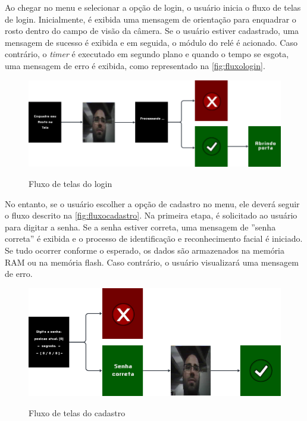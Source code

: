 Ao chegar no menu e selecionar a opção de login, o usuário inicia o 
fluxo de telas de login. Inicialmente, é exibida uma mensagem de 
orientação para enquadrar o rosto dentro do campo de visão da câmera. 
Se o usuário estiver cadastrado, uma mensagem de sucesso é exibida 
e em seguida, o módulo do relé é acionado. Caso contrário, o \textit{timer} 
é executado em segundo plano e quando o tempo se esgota, uma mensagem 
de erro é exibida, como representado na \autoref{fig:fluxologin}.

\begin{figure}[h!]
    \centering
    \caption{Fluxo de telas do login}
    \includegraphics[scale=2.1]{figuras/fluxo_login.png}
    \fonte{}%
    \label{fig:fluxologin}
    \centering
\end{figure}

No entanto, se o usuário escolher a opção de cadastro no menu, 
ele deverá seguir o fluxo descrito na \autoref{fig:fluxocadastro}. 
Na primeira etapa, é solicitado ao usuário para digitar a senha. 
Se a senha estiver correta, uma mensagem de ''senha correta'' é 
exibida e o processo de identificação e reconhecimento facial 
é iniciado. Se tudo ocorrer conforme o esperado, os dados são 
armazenados na memória RAM ou na memória flash. Caso contrário, 
o usuário visualizará uma mensagem de erro.

\begin{figure}[h!]
    \centering
    \caption{Fluxo de telas do cadastro}
    \includegraphics[scale=2]{figuras/fluxo_cadastro.png}
    \fonte{}%
    \label{fig:fluxocadastro}
    \centering
\end{figure}


